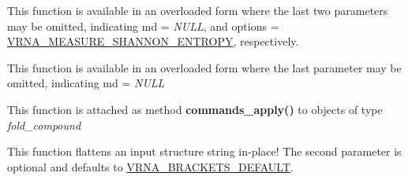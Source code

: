\begin{DoxyRefList}
\item[\label{wrappers__wrappers000002}%
\Hypertarget{wrappers__wrappers000002}%
Global \mbox{\hyperlink{group__aln__utils_gaa12b481a7e7b965ef2eb1bcc4399e759}{vrna\+\_\+aln\+\_\+conservation\+\_\+col}} (const char $\ast$$\ast$alignment, const vrna\+\_\+md\+\_\+t $\ast$md\+\_\+p, unsigned int options)]This function is available in an overloaded form where the last two parameters may be omitted, indicating {\ttfamily md} = {\itshape N\+U\+LL}, and {\ttfamily options} = \mbox{\hyperlink{group__aln__utils_ga1e659227c9fc077d29989f576f129000}{V\+R\+N\+A\+\_\+\+M\+E\+A\+S\+U\+R\+E\+\_\+\+S\+H\+A\+N\+N\+O\+N\+\_\+\+E\+N\+T\+R\+O\+PY}}, respectively.  
\item[\label{wrappers__wrappers000001}%
\Hypertarget{wrappers__wrappers000001}%
Global \mbox{\hyperlink{group__aln__utils_gab6f16a2ea93f3bfd4d089cc8d448bb16}{vrna\+\_\+aln\+\_\+conservation\+\_\+struct}} (const char $\ast$$\ast$alignment, const char $\ast$structure, const vrna\+\_\+md\+\_\+t $\ast$md)]This function is available in an overloaded form where the last parameter may be omitted, indicating {\ttfamily md} = {\itshape N\+U\+LL}  
\item[\label{wrappers__wrappers000005}%
\Hypertarget{wrappers__wrappers000005}%
Global \mbox{\hyperlink{group__file__utils_ga5e993fc4b9602af73aaaab4d3b3cd9a9}{vrna\+\_\+commands\+\_\+apply}} (vrna\+\_\+fold\+\_\+compound\+\_\+t $\ast$vc, vrna\+\_\+cmd\+\_\+t $\ast$commands, unsigned int options)]This function is attached as method {\bfseries commands\+\_\+apply()} to objects of type {\itshape fold\+\_\+compound}  
\item[\label{wrappers__wrappers000088}%
\Hypertarget{wrappers__wrappers000088}%
Global \mbox{\hyperlink{group__struct__utils_gae966b9f44168a4f4b39ca42ffb5f37b7}{vrna\+\_\+db\+\_\+flatten}} (char $\ast$structure, unsigned int options)]This function flattens an input structure string in-\/place! The second parameter is optional and defaults to \mbox{\hyperlink{group__struct__utils_ga559ebf76b1b289f85309f4206e99aa1a}{V\+R\+N\+A\+\_\+\+B\+R\+A\+C\+K\+E\+T\+S\+\_\+\+D\+E\+F\+A\+U\+LT}}.


\end{DoxyRefList}
